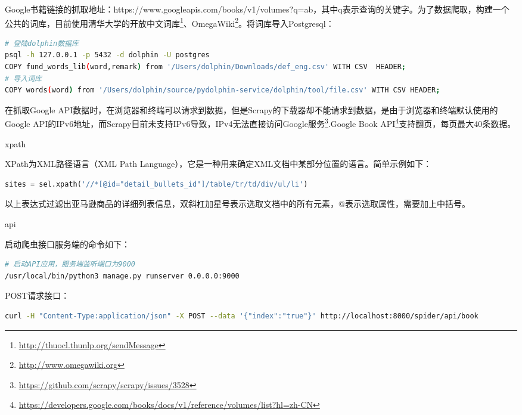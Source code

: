 \documentclass[8pt]{book}
\makeatletter
\numberwithin{dummy}{section}
\theoremstyle{ocrenumbox}
\theoremstyle{blacknumex}
\theoremstyle{blacknumbox}
\theoremstyle{ocrenum}
\renewcommand{\subsection}{\@startsection {subsection}{2}{\z@}
	{-3ex \@plus -0.1ex \@minus -.4ex}
	{0.5ex \@plus.2ex }
	{\normalfont\sffamily\bfseries}}
\renewcommand{\subsubsection}{\@startsection {subsubsection}{3}{\z@}
	{-2ex \@plus -0.1ex \@minus -.2ex}
	{.2ex \@plus.2ex }
	{\normalfont\small\sffamily\bfseries}}
\makeatother
\begin{document}
Google书籍链接的抓取地址：https://www.googleapis.com/books/v1/volumes?q=ab，其中q表示查询的关键字。为了数据爬取，构建一个公共的词库，目前使用清华大学的开放中文词库\footnote{\url{http://thuocl.thunlp.org/sendMessage}}、OmegaWiki\footnote{\url{http://www.omegawiki.org}}。将词库导入Postgresql：


\begin{lstlisting}[language=Bash]
# 登陆dolphin数据库
psql -h 127.0.0.1 -p 5432 -d dolphin -U postgres
COPY fund_words_lib(word,remark) from '/Users/dolphin/Downloads/def_eng.csv' WITH CSV  HEADER;
# 导入词库
COPY words(word) from '/Users/dolphin/source/pydolphin-service/dolphin/tool/file.csv' WITH CSV HEADER;
\end{lstlisting}

在抓取Google API数据时，在浏览器和终端可以请求到数据，但是Scrapy的下载器却不能请求到数据，是由于浏览器和终端默认使用的Google API的IPv6地址，而Scrapy目前未支持IPv6导致，IPv4无法直接访问Google服务\footnote{\url{https://github.com/scrapy/scrapy/issues/3528}}.Google Book API\footnote{\url{https://developers.google.com/books/docs/v1/reference/volumes/list?hl=zh-CN}}支持翻页，每页最大40条数据。

\subsubsection{xpath}

XPath为XML路径语言（XML Path Language），它是一种用来确定XML文档中某部分位置的语言。简单示例如下：

\begin{lstlisting}[language=Python]
sites = sel.xpath('//*[@id="detail_bullets_id"]/table/tr/td/div/ul/li') 
\end{lstlisting}

以上表达式过滤出亚马逊商品的详细列表信息，双斜杠加星号表示选取文档中的所有元素，@表示选取属性，需要加上中括号。


\subsection{api}

启动爬虫接口服务端的命令如下：

\begin{lstlisting}[language=Bash]
# 启动API应用，服务端监听端口为9000
/usr/local/bin/python3 manage.py runserver 0.0.0.0:9000
\end{lstlisting}


POST请求接口：

\begin{lstlisting}[language=Bash]
curl -H "Content-Type:application/json" -X POST --data '{"index":"true"}' http://localhost:8000/spider/api/book
\end{lstlisting}
\end{document}

